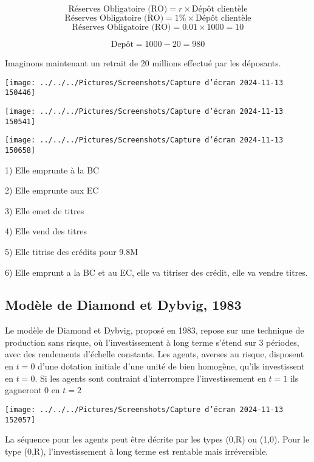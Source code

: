 \documentclass[a4paper, 12pt]{report}
\begin{document}
\[ \text{Réserves Obligatoire (RO)} = r \times \text{Dépôt clientèle} \]
\[ \text{Réserves Obligatoire (RO)} = 1\text{\%} \times \text{Dépôt clientèle} \]
\[ \text{Réserves Obligatoire (RO)} = 0.01 \times 1000 =10\]

\[ \text{Depôt} =1000-20=980\]


Imaginons maintenant un retrait de 20 millions effectué par les déposants.

\begin{center}
	\texttt{[image: ../../../Pictures/Screenshots/Capture d'écran 2024-11-13 150446]}
	
	\texttt{[image: ../../../Pictures/Screenshots/Capture d'écran 2024-11-13 150541]}
	
	\texttt{[image: ../../../Pictures/Screenshots/Capture d'écran 2024-11-13 150658]}
	
\end{center}

1) Elle emprunte à la BC

2) Elle emprunte aux EC

3) Elle emet de titres

4) Elle vend des titres

5) Elle titrise des crédits pour 9.8M

6) Elle emprunt a la BC et au EC, elle va titriser des crédit, elle va vendre titres. 

\subsection{Modèle de Diamond et Dybvig, 1983}

Le modèle de Diamond et Dybvig, proposé en 1983, repose sur une technique de production sans risque, où l'investissement à long terme s'étend sur 3 périodes, avec des rendements d'échelle constants. Les agents, averses au risque, disposent en \( t=0 \) d'une dotation initiale d'une unité de bien homogène, qu'ils investissent en \( t=0 \). Si les agents sont contraint d'interrompre l'investissement en \( t=1 \) ils gagneront 0 en \( t=2 \)

\begin{center}
	\texttt{[image: ../../../Pictures/Screenshots/Capture d'écran 2024-11-13 152057]}
\end{center}

La séquence pour les agents peut être décrite par les types (0,R) ou (1,0). Pour le type (0,R), l'investissement à long terme est rentable mais irréversible.
\end{document}
